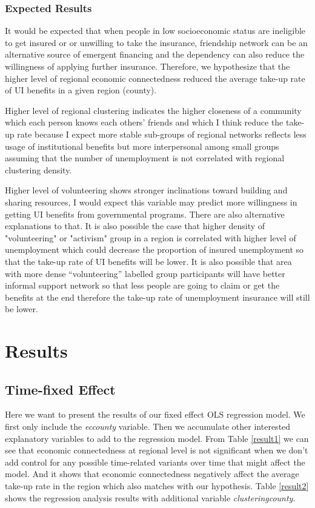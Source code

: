 \documentclass{article}
\begin{document}
\subsubsection{Expected Results}
It would be expected that when people in low socioeconomic status are ineligible to get insured or or unwilling to take the insurance, friendship network can be an alternative source of emergent financing and the dependency can also reduce the willingness of applying further insurance. Therefore, we hypothesize that the higher level of regional economic connectedness reduced the average take-up rate of UI benefits in a given region (county).

Higher level of regional clustering indicates the higher closeness of a community which each person knows each others' friends and which I think reduce the take-up rate because I expect more stable sub-groups of regional networks reflects less usage of institutional benefits but more interpersonal among small groups assuming that the number of unemployment is not correlated with regional clustering density.

Higher level of volunteering shows stronger inclinations toward building and sharing resources, I would expect this variable may predict more willingness in getting UI benefits from governmental programs. There are also alternative explanations to that. It is also possible the case that higher density of "volunteering" or "activism" group in a region is correlated with higher level of unemployment which could decrease the proportion of insured unemployment so that the take-up rate of UI benefits will be lower. It is also possible that area with more dense ``volunteering'' labelled group participants will have better informal support network so that less people are going to claim or get the benefits at the end therefore the take-up rate of unemployment insurance will still be lower. 

\section{Results}
\subsection{Time-fixed Effect}
Here we want to present the results of our fixed effect OLS regression model. We first only include the \textit{ec\textunderscore county} variable. Then we accumulate other interested explanatory variables to add to the regression model. From Table \ref{result1} we can see that economic connectedness at regional level is not significant when we don't add control for any possible time-related variants over time that might affect the model. And it shows that economic connectedness negatively affect the average take-up rate in the region which also matches with our hypothesis.  Table \ref{result2} shows the regression analysis results with additional variable \textit{clustering\textunderscore county}. 
\end{document}
